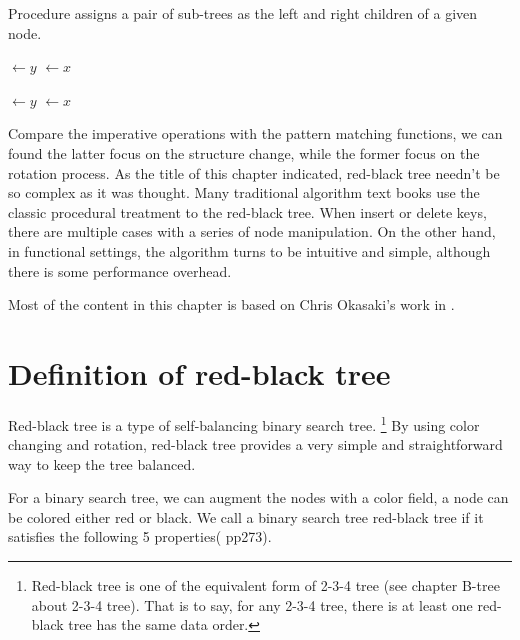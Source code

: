 \documentclass{article}
\begin{document}
Procedure  assigns a pair of sub-trees
as the left and right children of a given node.

\begin{algorithmic}[1]
  \State {}
  \State {}
\EndFunction

\Statex

  \State {} $\gets y$
     $\gets x$
  \EndIf
\EndFunction

\Statex

  \State {} $\gets y$
     $\gets x$
  \EndIf
\EndFunction
\end{algorithmic}

Compare the imperative operations with the pattern matching functions,
we can found the latter focus on the structure change, while the
former focus on the rotation process. As the title of this
chapter indicated, red-black tree needn't be so complex as it
was thought. Many traditional algorithm text books use the
classic procedural treatment to the red-black tree. When insert or delete
keys, there are multiple cases with a series of node manipulation.
On the other hand, in functional settings, the algorithm turns to be intuitive and
simple, although there is some performance overhead.

Most of the content in this chapter is based on Chris Okasaki's
work in \cite{okasaki}.

\section{Definition of red-black tree}

Red-black tree is a type of self-balancing binary search tree\cite{wiki}.
\footnote{Red-black tree is one of the equivalent form of 2-3-4 tree (see chapter
B-tree about 2-3-4 tree). That is to say, for any 2-3-4 tree, there is at least
one red-black tree has the same data order.} By using color changing and rotation,
red-black tree provides a very simple and straightforward way to keep
the tree balanced.

For a binary search tree, we can augment the nodes with a color field, a node
can be colored either red or black. We call a binary search tree red-black tree
if it satisfies the following 5 properties(\cite{CLRS} pp273).
\end{document}
